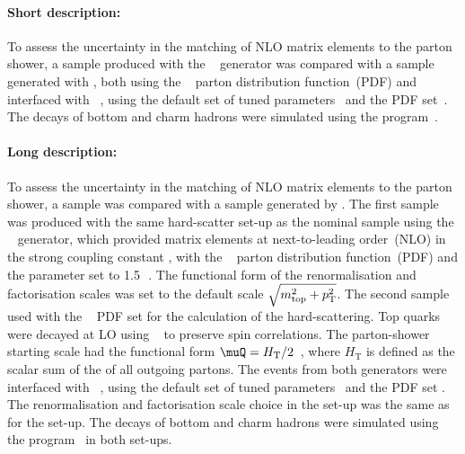 \paragraph{Short description:}

To assess the uncertainty in the matching of NLO matrix elements to the
parton shower, a sample produced with the
\POWHEGBOX[v2]~\cite{Frixione:2007nw,Nason:2004rx,Frixione:2007vw,Alioli:2010xd}
generator was compared with a sample generated with \MGNLO[2.6.0], both using the 
\NNPDF[3.0nlo]~\cite{Ball:2014uwa} parton distribution function~(PDF) and interfaced with
\HERWIG[7.13]~\cite{Bahr:2008pv,Bellm:2015jjp}, using the \HERWIG[7.1] default set of 
tuned parameters~\cite{Bellm:2015jjp} and the \MMHT[lo] PDF set~\cite{Harland-Lang:2014zoa}.
The decays of bottom and charm hadrons
were simulated using the \EVTGEN[1.6.0] program~\cite{Lange:2001uf}. 


\paragraph{Long description:}

To assess the uncertainty in the matching of NLO matrix elements to the parton shower, 
a \POWHEG sample was compared with a sample generated by \MGNLO. 
The first sample was produced with the same hard-scatter set-up as the nominal sample using the 
\POWHEGBOX[v2]~\cite{Frixione:2007nw,Nason:2004rx,Frixione:2007vw,Alioli:2010xd}
generator, which provided matrix elements at next-to-leading
order~(NLO) in the strong coupling constant \alphas, with the
\NNPDF[3.0nlo]~\cite{Ball:2014uwa} parton distribution function~(PDF) and
the \hdamp parameter set to 1.5\,\mtop~\cite{ATL-PHYS-PUB-2016-020}.
The functional form of the renormalisation and factorisation scales was
set to the default scale $\sqrt{m_{\textrm{top}}^2 + p_{\textrm T}^2}$.  
The second sample used \MGNLO[2.6.0] with the 
\NNPDF[3.0nlo]~\cite{Ball:2014uwa} PDF set for the calculation of the hard-scattering.
Top quarks were decayed at LO using
\MADSPIN~\cite{Frixione:2007zp,Artoisenet:2012st} to preserve spin
correlations. The parton-shower starting
scale had the functional form $\muQ = H_{\mathrm T}/2$~\cite{ATL-PHYS-PUB-2017-007}, 
where $H_{\mathrm T}$ is defined
as the scalar sum of the \pT of all outgoing partons.
The events from both generators were interfaced with
\HERWIG[7.13]~\cite{Bahr:2008pv,Bellm:2015jjp}, using the \HERWIG[7.1] default set
of tuned parameters~\cite{Bellm:2015jjp} and the \MMHT[lo] PDF set
\cite{Harland-Lang:2014zoa}.
The renormalisation and factorisation scale choice in the \MGNLO set-up was the same as for the
\POWHEGBOX set-up. The decays of bottom and charm hadrons were simulated
using the \EVTGEN[1.6.0] program~\cite{Lange:2001uf} in both set-ups.


